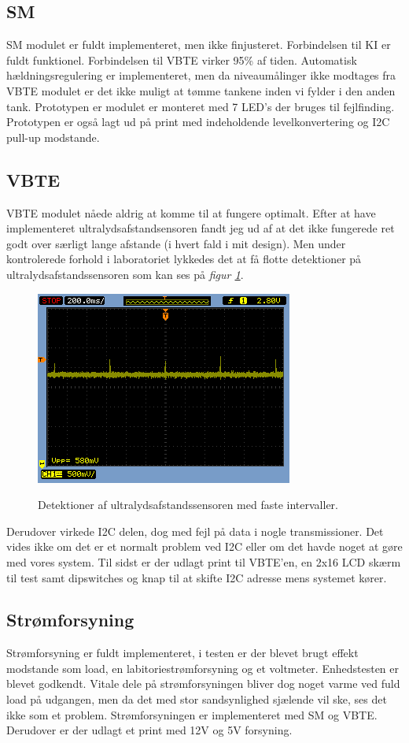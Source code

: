 \subsection{SM}
SM modulet er fuldt implementeret, men ikke finjusteret. Forbindelsen til KI er fuldt funktionel. Forbindelsen til VBTE virker 95\% af tiden. Automatisk hældningsregulering er implementeret, men da niveaumålinger ikke modtages fra VBTE modulet er det ikke muligt at tømme tankene inden vi fylder i den anden tank. Prototypen er modulet er monteret med 7 LED's der bruges til fejlfinding. Prototypen er også lagt ud på print med indeholdende levelkonvertering og I2C pull-up modstande.

\subsection{VBTE}
VBTE modulet nåede aldrig at komme til at fungere optimalt. Efter at have implementeret ultralydsafstandsensoren fandt jeg ud af at det ikke fungerede ret godt over særligt lange afstande (i hvert fald i mit design). Men under kontrolerede forhold i laboratoriet lykkedes det at få flotte detektioner på ultralydsafstandssensoren som kan ses på \textit{figur \ref{res:ultraresultater}}.
\begin{figure}[H]
\centering
\includegraphics[width = .5\textwidth]{billeder/mixer2}
\label{res:ultraresultater}
\caption{Detektioner af ultralydsafstandssensoren med faste intervaller.}
\end{figure}
Derudover virkede I2C delen, dog med fejl på data i nogle transmissioner. Det vides ikke om det er et normalt problem ved I2C eller om det havde noget at gøre med vores system. Til sidst er der udlagt print til VBTE'en, en 2x16 LCD skærm til test samt dipswitches og knap til at skifte I2C adresse mens systemet kører. 

\subsection{Strømforsyning}
Strømforsyning er fuldt implementeret, i testen er der blevet brugt effekt modstande som load, en labitoriestrømforsyning og et voltmeter. Enhedstesten er blevet godkendt. Vitale dele på strømforsyningen bliver dog noget varme ved fuld load på udgangen, men da det med stor sandsynlighed sjælende vil ske, ses det ikke som et problem. Strømforsyningen er implementeret med SM og VBTE. Derudover er der udlagt et print med 12V og 5V forsyning.

